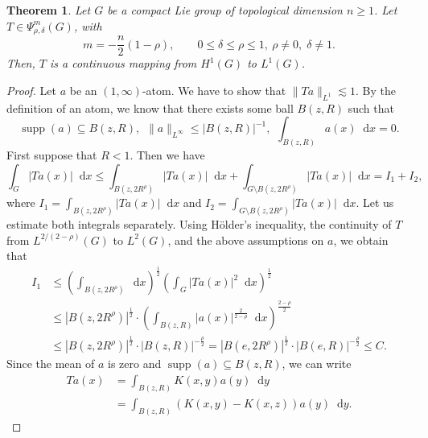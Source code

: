 \documentclass[10pt,a4paper]{amsart}
\newtheorem{theorem}{Theorem}
\newcommand*\diff{\mathop{}\!\mathrm{d}}
\begin{document}
\begin{theorem}\label{H1:L1}
    Let $G$ be a compact Lie group of topological dimension $n\geq 1$. Let $T\in\Psi^{m}_{\rho,\delta}(G)$, with \[
m = -\frac{n}{2}(1-\rho),
\qquad 0 \le \delta \le \rho \le 1,\ \rho\neq0,\;\delta \neq 1.
\]
Then, $T$ is a continuous mapping from $H^1(G)$ to $L^{1}(G)$.
\end{theorem}

\begin{proof}
    Let $a$ be an $(1,\infty)$-atom. We have to show that $\|Ta\|_{L^1}\lesssim 1$. By the definition of an atom, we know that there exists some ball $B(z,R)$ such that
    \begin{equation*}
        \operatorname{supp}(a)\subseteq B(z,R),\hspace{5pt}\|a\|_{L^\infty}\leq|B(z,R)|^{-1},\hspace{5pt}\int_{B(z,R)}a(x)\diff{x}=0.
    \end{equation*}
    First suppose that $R<1$. Then we have
    \begin{equation*}
        \int_{G}|Ta(x)|\diff{x}\leq\int_{B(z,2R^\rho)}|Ta(x)|\diff{x}+\int_{G\setminus B(z,2R^\rho)}|Ta(x)|\diff{x}=I_1+I_2,
    \end{equation*}
    where $I_1=\int_{B(z,2R^\rho)}|Ta(x)|\diff{x}$ and $I_2=\int_{G\setminus B(z,2R^\rho)}|Ta(x)|\diff{x}$. Let us estimate both integrals separately. Using H\"older's inequality, the continuity of $T$ from $L^{2/(2-\rho)}(G)$ to $L^{2}(G)$, and the above assumptions on $a$, we obtain that
     \begin{equation*}
        \begin{aligned}
        I_1&\leq\left(\int_{B(z,2R^\rho)}\diff{x}\right)^{\frac{1}{2}}\left(\int_{G}|Ta(x)|^2\diff{x}\right)^{\frac{1}{2}}\\
        &\leq|B(z,2R^\rho)|^{\frac{1}{2}}\cdot\left(\int_{B(z,R)}|a(x)|^{\frac{2}{2-\rho}}\diff{x}\right)^{\frac{2-\rho}{2}}\\
        &\leq|B(z,2R^\rho)|^{\frac{1}{2}}\cdot|B(z,R)|^{-\frac{\rho}{2}}=|B(e,2R^\rho)|^{\frac{1}{2}}\cdot|B(e,R)|^{-\frac{\rho}{2}}\leq C.
    \end{aligned}
    \end{equation*}
    Since the mean of $a$ is zero and $\operatorname{supp}(a)\subseteq B(z,R)$, we can write
   \begin{equation*}
    \begin{aligned}
        Ta(x)&=\int_{B(z,R)}K(x,y)a(y)\diff{y}\\
        &=\int_{B(z,R)}(K(x,y)-K(x,z))a(y)\diff{y}.

\end{aligned}
\end{equation*}
\end{proof}
\end{document}

